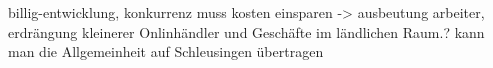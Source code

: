 billig-entwicklung, konkurrenz muss kosten einsparen -> ausbeutung arbeiter, erdrängung kleinerer Onlinhändler und Geschäfte im ländlichen Raum.? kann man die Allgemeinheit auf Schleusingen übertragen